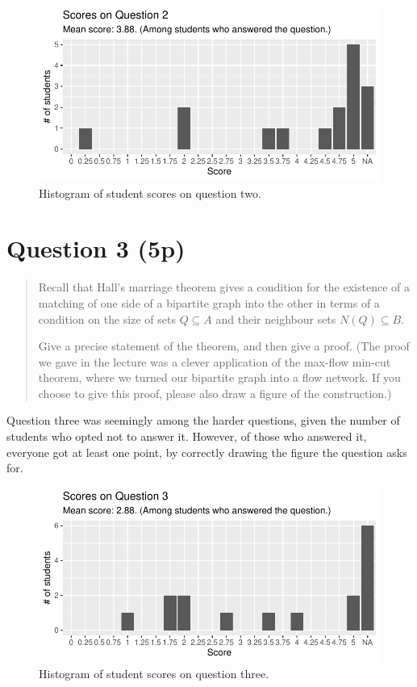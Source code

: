 \documentclass[nobib]{tufte-handout}
\begin{document}
\begin{figure}[p]
  \centering
  \includegraphics[width = \textwidth]{Q2.pdf}
  \caption[Score histogram for Q2]{Histogram of student scores on question two.}
  \label{fig:Q2}
\end{figure}

\section{Question 3 (5p)} %

\begin{quotation}
  Recall that Hall's marriage theorem gives a condition for the existence of a matching of one side of a bipartite graph into the other in terms of a condition on the size of sets $Q \subseteq A$ and their neighbour sets $N(Q) \subseteq B$.

  Give a precise statement of the theorem, and then give a proof. (The proof we gave in the lecture was a clever application of the max-flow min-cut theorem, where we turned our bipartite graph into a flow network. If you choose to give this proof, please also draw a figure of the construction.)
\end{quotation}

Question three was seemingly among the harder questions, given the number of students who opted not to answer it. However, of those who answered it, everyone got at least one point, by correctly drawing the figure the question asks for.

\begin{figure}[p]
  \centering
  \includegraphics[width = \textwidth]{Q3.pdf}
  \caption[Score histogram for Q3]{Histogram of student scores on question three.}
  \label{fig:Q3}
\end{figure}
\end{document}
